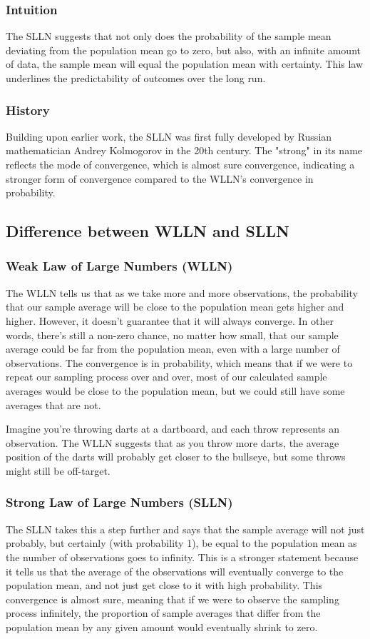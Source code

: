 \documentclass{article}
\begin{document}
\subsubsection{Intuition}
The SLLN suggests that not only does the probability of the sample mean deviating from the population mean go to zero, but also, with an infinite amount of data, the sample mean will equal the population mean with certainty. This law underlines the predictability of outcomes over the long run.

\subsubsection{History}
Building upon earlier work, the SLLN was first fully developed by Russian mathematician Andrey Kolmogorov in the 20th century. The "strong" in its name reflects the mode of convergence, which is almost sure convergence, indicating a stronger form of convergence compared to the WLLN's convergence in probability.

\subsection{Difference between WLLN and SLLN}

\subsubsection{Weak Law of Large Numbers (WLLN)}
The WLLN tells us that as we take more and more observations, the probability that our sample average will be close to the population mean gets higher and higher. However, it doesn't guarantee that it will always converge. In other words, there's still a non-zero chance, no matter how small, that our sample average could be far from the population mean, even with a large number of observations. The convergence is in probability, which means that if we were to repeat our sampling process over and over, most of our calculated sample averages would be close to the population mean, but we could still have some averages that are not.

Imagine you're throwing darts at a dartboard, and each throw represents an observation. The WLLN suggests that as you throw more darts, the average position of the darts will probably get closer to the bullseye, but some throws might still be off-target.

\subsubsection{Strong Law of Large Numbers (SLLN)}
The SLLN takes this a step further and says that the sample average will not just probably, but certainly (with probability 1), be equal to the population mean as the number of observations goes to infinity. This is a stronger statement because it tells us that the average of the observations will eventually converge to the population mean, and not just get close to it with high probability. This convergence is almost sure, meaning that if we were to observe the sampling process infinitely, the proportion of sample averages that differ from the population mean by any given amount would eventually shrink to zero.
\end{document}
